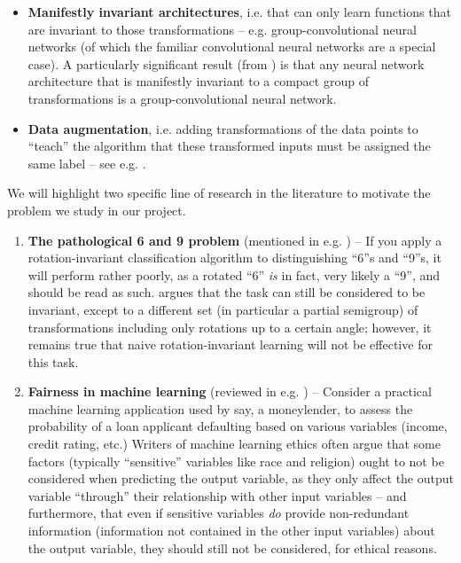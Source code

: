 \documentclass[12pt]{article}
\theoremstyle{definition}
\numberwithin{equation}{section}
\numberwithin{figure}{section}
\numberwithin{table}{section}
\begin{document}
\begin{itemize}
    \item \textbf{Manifestly invariant architectures}, i.e. that can only learn functions that are invariant to those transformations -- e.g. group-convolutional neural networks \cite{cohen2} (of which the familiar convolutional neural networks are a special case). A particularly significant result (from \cite{trivedi}) is that any neural network architecture that is manifestly invariant to a compact group of transformations is a group-convolutional neural network.
    \item \textbf{Data augmentation}, i.e. adding transformations of the data points to ``teach'' the algorithm that these transformed inputs must be assigned the same label -- see e.g. \cite{ilse, sxchen}.
\end{itemize}

We will highlight two specific line of research in the literature to motivate the problem we study in our project.

\begin{enumerate}
    \item \textbf{The pathological 6 and 9 problem} (mentioned in e.g. \cite{varma, ling}) -- If you apply a rotation-invariant classification algorithm to distinguishing ``6''s and ``9''s, it will perform rather poorly, as a rotated ``6'' \emph{is} in fact, very likely a ``9'', and should be read as such. \cite{benton} argues that the task can still be considered to be invariant, except to a different set (in particular a partial semigroup) of transformations including only rotations up to a certain angle; however, it remains true that naive rotation-invariant learning will not be effective for this task.
    \item \textbf{Fairness in machine learning} (reviewed in e.g. \cite{oatml}) -- Consider a practical machine learning application used by say, a moneylender, to assess the probability of a loan applicant defaulting based on various variables (income, credit rating, etc.) Writers of machine learning ethics often argue \cite{fair} that some factors (typically ``sensitive'' variables like race and religion) ought to not be considered when predicting the output variable, as they only affect the output variable ``through'' their relationship with other input variables -- and furthermore, that even if sensitive variables \emph{do} provide non-redundant information (information not contained in the other input variables) about the output variable, they should still not be considered, for ethical reasons.
\end{enumerate}
\end{document}
